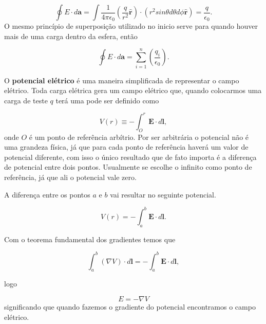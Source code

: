 \[\oint E \cdot d\textbf{a} = \int \frac{1}{4 \pi \epsilon_{0}} (\frac{q}{r^2}\hat{\textbf{r}})\cdot (r^2 sin \theta d\theta d\phi \hat{\textbf{r}}) = \frac{q}{\epsilon_{0}}.\] 
O mesmo princípio de superposição utilizado no inicio serve para quando houver mais de uma carga dentro da esfera, então


\[\oint E \cdot d\textbf{a} = \sum_{i=1}^n (\frac{q_{i}}{\epsilon_{0}}). \]

O \textbf{potencial elétrico} é uma maneira simplificada de representar o campo elétrico. Toda carga elétrica gera um campo elétrico que, quando colocarmos uma carga de teste $q$ terá uma pode ser definido como


\[ V(r) \equiv - \int_{O}^r \textbf{E} \cdot d\textbf{l}, \] 
onde $O$ é um ponto de referência arbítrio. Por ser arbitrária o potencial não é uma grandeza física, já que para cada ponto de referência haverá um valor de potencial diferente, com isso o único resultado que de fato importa é a diferença de potencial entre dois pontos. Usualmente se escolhe o infinito como ponto de referência, já que ali o potencial vale zero. 

A diferença entre os pontos $a$ e $b$ vai resultar no seguinte potencial.


\[ V(r) = - \int_{a}^{b} \textbf{E} \cdot d\textbf{l}.\]

Com o teorema fundamental dos gradientes temos que


\[\int_{a}^{b} (\nabla V) \cdot d\textbf{l} = - \int_{a}^{b} \textbf{E} \cdot d\textbf{l},\]

logo 


\[E = - \nabla V\]
significando que quando fazemos o gradiente do potencial encontramos o campo elétrico. 

